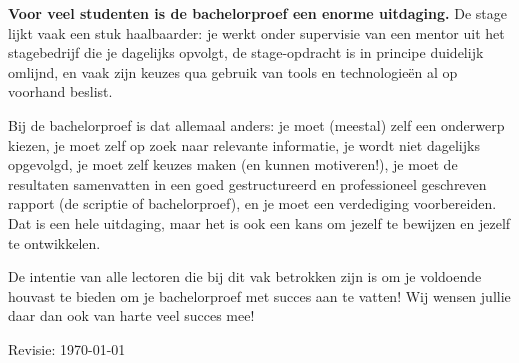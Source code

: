 \textbf{Voor veel studenten is de bachelorproef een enorme uitdaging.} De stage lijkt vaak een stuk haalbaarder: je werkt onder supervisie van een mentor uit het stagebedrijf die je dagelijks opvolgt, de stage-opdracht is in principe duidelijk omlijnd, en vaak zijn keuzes qua gebruik van tools en technologieën al op voorhand beslist.

Bij de bachelorproef is dat allemaal anders: je moet (meestal) zelf een onderwerp kiezen, je moet zelf op zoek naar relevante informatie, je wordt niet dagelijks opgevolgd, je moet zelf keuzes maken (en kunnen motiveren!), je moet de resultaten samenvatten in een goed gestructureerd en professioneel geschreven rapport (de scriptie of bachelorproef), en je moet een verdediging voorbereiden. Dat is een hele uitdaging, maar het is ook een kans om jezelf te bewijzen en jezelf te ontwikkelen.

De intentie van alle lectoren die bij dit vak betrokken zijn is om je voldoende houvast te bieden om je bachelorproef met succes aan te vatten! Wij wensen jullie daar dan ook van harte veel succes mee!

\bigskip
Revisie: \today